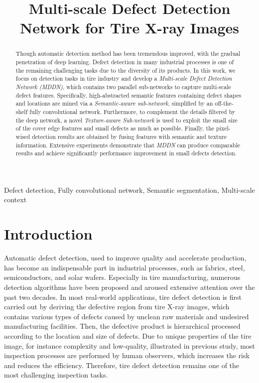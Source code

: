 \documentclass{article}
\title{Multi-scale Defect Detection Network for Tire X-ray Images}
\begin{document}

\maketitle

\begin{abstract}
Though automatic detection method has been tremendous improved, with the gradual penetration of deep learning. Defect detection in many industrial processes is one of the remaining challenging tasks due to the diversity of its products. In this work, we focus on detection tasks in tire industry and develop a {\it Multi-scale Defect Detection Network (MDDN)}, which contains two parallel sub-networks to capture multi-scale defect features. Specifically, high-abstracted semantic features containing defect shapes and locations are mined via a {\it Semantic-aware sub-network}, simplified by an off-the-shelf fully convolutional network. Furthermore, to complement the details filtered by the deep network, a novel {\it Texture-aware Sub-network} is used to exploit the small size of the cover edge features and small defects as much as possible. Finally, the pixel-wised detection results are obtained by fusing features with semantic and texture information. Extensive experiments demonstrate that {\it MDDN} can produce comparable results and achieve significantly performance improvement in small defects detection.
\end{abstract}

\begin{keywords}
Defect detection, Fully convolutional network, Semantic segmentation, Multi-scale context
\end{keywords}

\section{Introduction}
\label{sec:intro}
Automatic defect detection, used to improve quality and accelerate production, has become an indispensable part in industrial processes, such as fabrics\cite{kumar2008computer,ngan2011automated,li2016deformable}, steel\cite{ghorai2012automatic}, semiconductors\cite{bai2014saliency}, and solar wafers\cite{tsai2012defect}. Especially in tire manufacturing, numerous detection algorithms have been proposed\cite{zhang2013texture,cui2016defect,cui2016novel,zhang2018tire,guo2016defect} and aroused extensive attention over the past two decades. In most real-world applications, tire defect detection is first carried out by deriving the defective region from tire X-ray images, which contains various types of defects caused by unclean raw materials and undesired manufacturing facilities\cite{guo2012tire}. Then, the defective product is hierarchical processed according to the location and size of defects. Due to unique properties of the tire image, for instance complexity and low-quality, illustrated in previous study\cite{zhang2013defect,wang2019tire}, most inspection processes are performed by human observers, which increases the risk and reduces the efficiency. Therefore, tire defect detection remains one of the most challenging inspection tasks.
\end{document}
